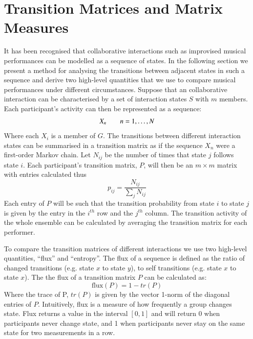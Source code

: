 \documentclass{sigchi}
\begin{document}
\section{Transition Matrices and Matrix Measures}

It has been recognised that collaborative interactions such as
improvised musical performances can be modelled as a sequence of
states. In the following section we present a method for analysing the
transitions between adjacent states in such a sequence and derive two
high-level quantities that we use to compare musical performances
under different circumstances. Suppose that an collaborative
interaction can be characterised by a set of interaction states $S$
with $m$ members. Each participant's activity can then be represented
as a sequence:
\begin{equation}
 X_n \hskip 2em n = 1, \ldots, N
\end{equation}
Where each $X_i$ is a member of $G$. The transitions between different
interaction states can be summarised in a transition matrix as if the
sequence $X_n$ were a first-order Markov chain. Let $N_{ij}$ be the
number of times that state $j$ follows state $i$. Each participant's
transition matrix, $P$, will then be an $m \times m$ matrix with
entries calculated thus
\begin{equation}
  p_{ij} = \frac{N_{ij}}{\sum_j N_{ij}}
\end{equation}
Each entry of $P$ will be such that the transition probability from
state $i$ to state $j$ is given by the entry in the $i^{th}$ row and
the $j^{th}$ column. The transition activity of the whole ensemble can
be calculated by averaging the transition matrix for each performer.

To compare the transition matrices of different interactions we use
two high-level quantities, ``flux'' and ``entropy''. The flux of a
sequence is defined as the ratio of changed transitions (e.g. state $x$
to state $y$), to self transitions (e.g. state $x$ to state $x$). The
the flux of a transition matrix $P$ can be calculated as:
\begin{equation}
  \mathrm{flux}(P) = 1 - tr(P)
\end{equation}
Where the trace of P, $tr(P)$ is given by the vector 1-norm of the
diagonal entries of $P$. 
Intuitively, flux is a measure of how frequently a group changes state. Flux
returns a value in the interval $[0,1]$ and will return 0 when
participants never change state, and 1 when participants never stay on
the same state for two measurements in a row.
\end{document}
